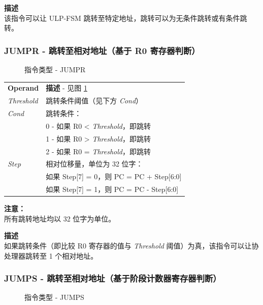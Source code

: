 \documentclass[main\_\_CN.tex]{subfiles}
\begin{document}
\textbf{描述} \\
该指令可以让 ULP-FSM 跳转至特定地址，跳转可以为无条件跳转或有条件跳转。


\subsubsection {JUMPR - 跳转至相对地址（基于 R0 寄存器判断）}

%
%
%
%
%
\begin{figure}[!ht]
    \centering
    \caption{指令类型 - JUMPR}
    \label{figure:JUMPR}
\end{figure}

\begin{tabular}{ l l }
\textbf{Operand} & \textbf{描述} - 见图 \ref{figure:JUMPR} \\
\textit{Threshold} & 跳转条件阈值（见下方 \textit{Cond}）\\
\textit{Cond} & 跳转条件：\\
 & 0 - 如果 R0 < \textit{Threshold}，即跳转 \\
 & 1 - 如果 R0 > \textit{Threshold}，即跳转 \\
 & 2 - 如果 R0 = \textit{Threshold}，即跳转 \\
\textit{Step} & 相对位移量，单位为 32 位字：\\
 & 如果 Step[7] = 0，则 PC = PC + Step[6:0] \\
 & 如果 Step[7] = 1，则 PC = PC - Step[6:0] \\
\end{tabular}

\textbf{注意：} \\
所有跳转地址均以 32 位字为单位。

\textbf{描述} \\
如果跳转条件（即比较 R0 寄存器的值与 \textit{Threshold} 阈值）为真，该指令可以让协处理器跳转至 1 个相对地址。

\newpage
\subsubsection {JUMPS - 跳转至相对地址（基于阶段计数器寄存器判断）}\label{jumpstorelativeaddress}

%
%
%
%
%
\begin{figure}[!ht]
    \centering
    \caption{指令类型 - JUMPS}
    \label{figure:JUMPS}
\end{figure}
\end{document}
